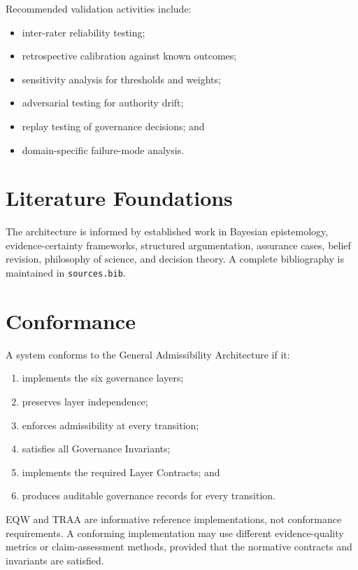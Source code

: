 \documentclass[11pt,a4paper]{article}
\begin{document}
Recommended validation activities include:

\begin{itemize}[leftmargin=*]
  \item inter-rater reliability testing;
  \item retrospective calibration against known outcomes;
  \item sensitivity analysis for thresholds and weights;
  \item adversarial testing for authority drift;
  \item replay testing of governance decisions; and
  \item domain-specific failure-mode analysis.
\end{itemize}

\section{Literature Foundations}

The architecture is informed by established work in Bayesian epistemology, evidence-certainty frameworks, structured argumentation, assurance cases, belief revision, philosophy of science, and decision theory. A complete bibliography is maintained in \texttt{sources.bib}.

\section{Conformance}

A system conforms to the General Admissibility Architecture if it:

\begin{enumerate}[leftmargin=*]
  \item implements the six governance layers;
  \item preserves layer independence;
  \item enforces admissibility at every transition;
  \item satisfies all Governance Invariants;
  \item implements the required Layer Contracts; and
  \item produces auditable governance records for every transition.
\end{enumerate}

EQW and TRAA are informative reference implementations, not conformance requirements. A conforming implementation may use different evidence-quality metrics or claim-assessment methods, provided that the normative contracts and invariants are satisfied.
\end{document}
